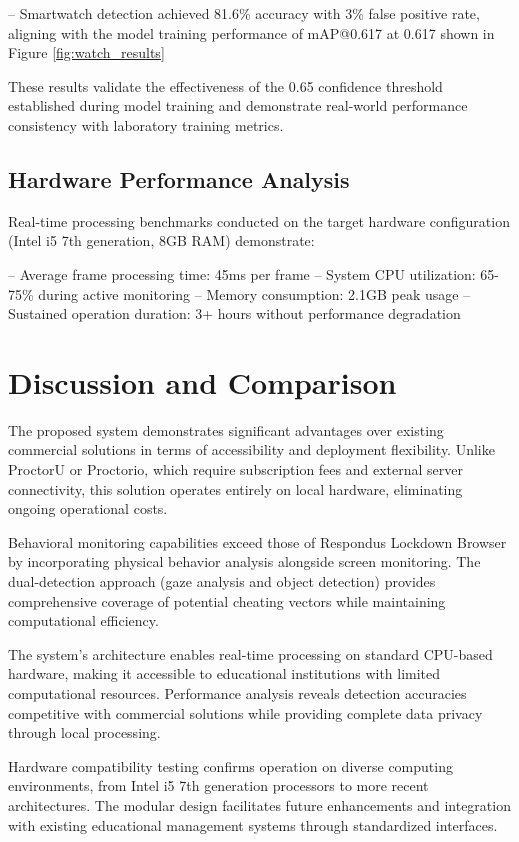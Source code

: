 \documentclass[conference]{IEEEtran}
\begin{document}
-- Smartwatch detection achieved 81.6\% accuracy with 3\% false positive rate, 
aligning with the model training performance of mAP@0.617 at 0.617 shown in Figure \ref{fig:watch_results}

These results validate the effectiveness of the 0.65 confidence threshold established 
during model training and demonstrate real-world performance consistency with 
laboratory training metrics.

\subsection{Hardware Performance Analysis}

Real-time processing benchmarks conducted on the target hardware configuration 
(Intel i5 7th generation, 8GB RAM) demonstrate:

-- Average frame processing time: 45ms per frame
-- System CPU utilization: 65-75\% during active monitoring
-- Memory consumption: 2.1GB peak usage
-- Sustained operation duration: 3+ hours without performance degradation

\section{Discussion and Comparison}

The proposed system demonstrates significant advantages over existing commercial solutions 
in terms of accessibility and deployment flexibility. Unlike ProctorU or Proctorio, which 
require subscription fees and external server connectivity\cite{proctoru}\cite{proctorio}, 
this solution operates entirely on local hardware, eliminating ongoing operational costs.

Behavioral monitoring capabilities exceed those of Respondus Lockdown Browser by incorporating 
physical behavior analysis alongside screen monitoring\cite{respondus}. The dual-detection 
approach (gaze analysis and object detection) provides comprehensive coverage of potential 
cheating vectors while maintaining computational efficiency.

The system's architecture enables real-time processing on standard CPU-based hardware, 
making it accessible to educational institutions with limited computational resources. 
Performance analysis reveals detection accuracies competitive with commercial solutions 
while providing complete data privacy through local processing.

Hardware compatibility testing confirms operation on diverse computing environments, 
from Intel i5 7th generation processors to more recent architectures. The modular 
design facilitates future enhancements and integration with existing educational 
management systems through standardized interfaces.
\end{document}
